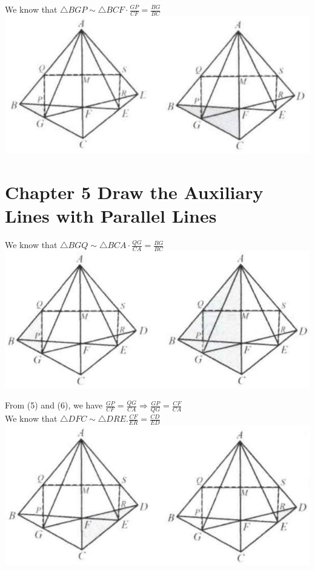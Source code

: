 \documentclass[10pt]{article}
\begin{document}
We know that \(\triangle B G P \sim \triangle B C F \cdot \frac{G P}{C F}=\frac{B G}{B C}\)\\
\includegraphics[max width=\textwidth, center]{2025_04_17_97bc1f7e44d93c271a88g-143(1)}

\section*{Chapter 5 Draw the Auxiliary Lines with Parallel Lines}
We know that \(\triangle B G Q \sim \triangle B C A \cdot \frac{Q G}{C A}=\frac{B G}{B C}\)\\
\includegraphics[max width=\textwidth, center]{2025_04_17_97bc1f7e44d93c271a88g-144(2)}

From (5) and (6), we have \(\frac{G P}{C F}=\frac{Q G}{C A} \Rightarrow \frac{G P}{Q G}=\frac{C F}{C A}\)\\
We know that \(\triangle D F C \sim \triangle D R E . \frac{C F}{E R}=\frac{C D}{E D}\)\\
\includegraphics[max width=\textwidth, center]{2025_04_17_97bc1f7e44d93c271a88g-144(1)}
\end{document}
